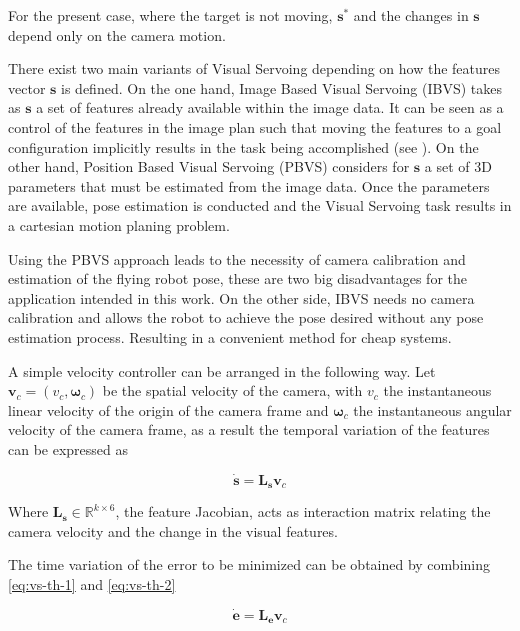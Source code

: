 For the present case, where the target is not moving,  $\bm{s}^\ast$ and the changes in $\bm{s}$ depend only on the camera motion.

There exist two main variants of Visual Servoing depending on how the features vector $\bm{s}$ is defined. On the one hand, Image Based Visual Servoing (IBVS) takes as $\bm{s}$ a set of features already available within the image data. It can be seen as a control of the features in the image plan such that moving the features to a goal configuration implicitly results in the task being accomplished (see \cite{espiau_1992}). On the other hand, Position Based Visual Servoing (PBVS) considers for $\bm{s}$ a set of 3D parameters that must be estimated from the image data. Once the parameters are available, pose estimation is conducted and the Visual Servoing task results in a cartesian motion planing problem.


Using the PBVS approach leads to the necessity of camera calibration and estimation of the flying robot pose, these are two big disadvantages for the application intended in this work. On the other side, IBVS needs no camera calibration and allows the robot to achieve the pose desired without any pose estimation process. Resulting in a convenient method for cheap systems.

A simple velocity controller can be arranged in the following way. Let $\bm{v}_c = (v_c, \bm{\omega}_c)$ be the spatial velocity of the camera, with $v_c$ the instantaneous linear velocity of the origin of the camera frame and $\bm{\omega}_c$ the instantaneous angular velocity of the camera frame, as a result the temporal variation of the features can be expressed as

\begin{equation}
\dot{\bm{s}} = \bm{L_s} \bm{v}_c
\label{eq:vs-th-2}
\end{equation}

Where $\bm{L_s} \in \mathbb{R}^{k \times 6}$, the feature Jacobian, acts as interaction matrix relating the camera velocity and the change in the visual features.

The time variation of the error to be minimized can be obtained by combining \ref{eq:vs-th-1} and \ref{eq:vs-th-2}

\begin{equation}
\dot{\bm{e}} = \bm{L_e} \bm{v}_c
\label{eq:vs-th-3}
\end{equation}

